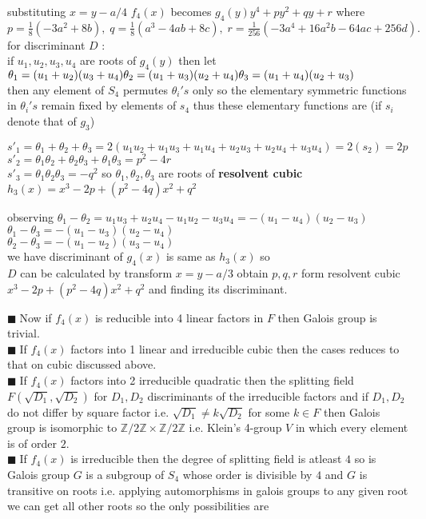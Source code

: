 \documentclass[11pt]{extarticle}
\newcommand{\Z}{\mathbb{Z}}
\newcommand{\tm}{\times}
\newcommand{\tbx}[2][]{
\begin{tcolorbox}[enhanced,breakable,size=small,colback=black!2!white,title={#1},arc is angular, arc=1.5mm,drop fuzzy shadow]
	#2
\end{tcolorbox}
}
\newcommand{\y}{$\blacksquare\;$}
\begin{document}
\begin{multicols}{2}
{substituting $ x=y-a/4 $ $ f_4(x) $ becomes $ g_4(y) y^4+py^2+qy+r$ where $ p=\frac{ 1 }{8} (-3a^2+8b),\; q=\frac{ 1 }{8} (a^3-4ab+8c),\; r=\frac{ 1 }{256} (-3a^4+16a^2b-64ac+256d) .$ \\
for discriminant $ D $ :\\
if $ u_1,u_2,u_3,u_4$ are roots of  $g_4(y)$ then let\\
$ \theta_1=(u_1+u_2)(u_3+u_4)\\
\theta_2 =(u_1+u_3)(u_2+u_4) \\
\theta_3=(u_1+u_4)(u_2+u_3)$ \\
then any element of $ S_4 $ permutes $ \theta _i's$ only so the elementary symmetric functions in $ \theta_i's $ remain fixed by elements of $ s_4 $ thus these elementary functions are (if $ s_i $  denote that of $ g_3 $)}
\tbx{
$ s'_1=\theta_1+\theta_2+\theta_3=2(u_1u_2+u_1u_3+u_1u_4+u_2u_3+u_2u_4+u_3u_4) =2(s_2)=2p$ \\
$ s'_2= \theta_1\theta_2+\theta_2\theta_3+\theta_1\theta_3=p^2-4r$\\
$ s'_3=\theta_1\theta_2\theta_3=-q^2 $ 
so $ \theta_1,\theta_2,\theta_3$  are roots of \textbf{resolvent cubic }$h_3(x)=  x^3-2p+(p^2-4q) x^2+q^2$ }
\tbx{
observing $ \theta_1-\theta_2=u_1u_3+u_2u_4-u_1u_2-u_3u_4=-(u_1-u_4)(u_2-u_3) $ \\
 $ \theta_1-\theta_3=-(u_1-u_3)(u_2-u_4) $\\
 $ \theta_2-\theta_3=-(u_1-u_2)(u_3-u_4) $\\
 we have discriminant of $ g_4(x) $ is same as $ h_3(x) $ so\\
 $ D$ can be calculated by transform $ x=y-a/3 $ obtain $ p,q,r $ form resolvent cubic $ x^3-2p+(p^2-4q) x^2+q^2$ and finding its discriminant.}
 \tbx{
 \y Now if $ f_4(x) $ is reducible into 4  linear factors in $ F $ then Galois group is trivial.\\
 \y If $ f_4(x) $ factors into 1 linear and irreducible cubic then the cases reduces to that on cubic discussed above.
 \\
 \y If $ f_4(x) $ factors into 2 irreducible quadratic then the splitting field $ F(\sqrt{D_1},\sqrt{D_2})$ for $ D_1,D_2 $ discriminants of the irreducible factors and if $ D_1,D_2 $ do not differ by square factor i.e. $ \sqrt{D_1}\neq k \sqrt{D_2}$ for some $ k\in F $ then Galois group is isomorphic to $ \Z/2\Z\tm \Z/2 \Z $ i.e. Klein's 4-group $ V $ in which every element is of order $ 2 .$ \\
\y  If $ f_4(x) $ is irreducible then the degree of splitting field is atleast $ 4 $ so is Galois group $ G $ is a subgroup of $ S_4 $ whose order is divisible by $ 4 $ and $ G $ is transitive on roots i.e. applying automorphisms in galois groups to any given root we can get all other roots so the only possibilities are \\
}
\end{multicols}
\end{document}
